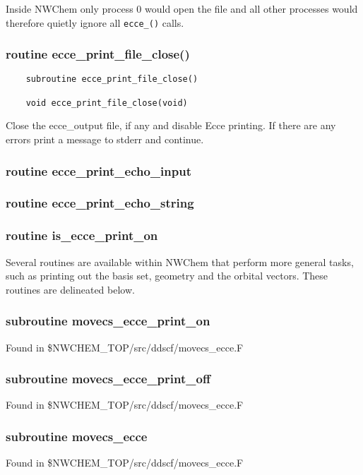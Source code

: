     Inside NWChem only process $0$ would open the file and all other
    processes would therefore quietly ignore all \texttt{ecce\_\*()} calls.

\subsubsection{ routine ecce\_print\_file\_close()}

\begin{verbatim}
    subroutine ecce_print_file_close()

    void ecce_print_file_close(void)
\end{verbatim}
Close the ecce\_output file, if any and disable Ecce printing.  If
there are any errors print a message to stderr and continue.

\subsubsection{ routine ecce\_print\_echo\_input }

\subsubsection{ routine ecce\_print\_echo\_string }

\subsubsection{ routine is\_ecce\_print\_on }


Several routines are available within NWChem that perform more general tasks,
such as printing out the basis set, geometry and the orbital vectors.  These
routines are delineated below.

\subsubsection{ subroutine movecs\_ecce\_print\_on }
Found in \$NWCHEM\_TOP/src/ddscf/movecs\_ecce.F

\subsubsection{ subroutine movecs\_ecce\_print\_off }
Found in \$NWCHEM\_TOP/src/ddscf/movecs\_ecce.F

\subsubsection{ subroutine movecs\_ecce }
Found in \$NWCHEM\_TOP/src/ddscf/movecs\_ecce.F

